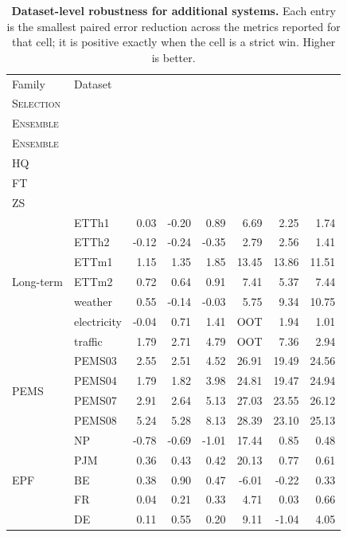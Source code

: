 \begin{table}[h!]
\centering
\scriptsize
\setlength{\tabcolsep}{3.5pt}
\caption{\textbf{Dataset-level robustness for additional systems.} Each entry is the smallest paired error reduction across the metrics reported for that cell; it is positive exactly when the cell is a strict win. Higher is better.}
\label{tab:strong-system-worst-gain}
\begin{tabular}{llrrrrrr}
\toprule
Family & Dataset & \shortstack{\textsc{Forward}\\\textsc{Selection}} & \shortstack{\textsc{Portfolio}\\\textsc{Ensemble}} & \shortstack{\textsc{ZeroShot}\\\textsc{Ensemble}} & \shortstack{\autogluon{}\\HQ} & \shortstack{\chronosbolt{}\\FT} & \shortstack{\chronosbolt{}\\ZS}\\
\midrule
\multirow{7}{*}{Long-term} & ETTh1 & 0.03 & -0.20 & 0.89 & 6.69 & 2.25 & 1.74\\
 & ETTh2 & -0.12 & -0.24 & -0.35 & 2.79 & 2.56 & 1.41\\
 & ETTm1 & 1.15 & 1.35 & 1.85 & 13.45 & 13.86 & 11.51\\
 & ETTm2 & 0.72 & 0.64 & 0.91 & 7.41 & 5.37 & 7.44\\
 & weather & 0.55 & -0.14 & -0.03 & 5.75 & 9.34 & 10.75\\
 & electricity & -0.04 & 0.71 & 1.41 & OOT & 1.94 & 1.01\\
 & traffic & 1.79 & 2.71 & 4.79 & OOT & 7.36 & 2.94\\
\midrule
\multirow{4}{*}{PEMS} & PEMS03 & 2.55 & 2.51 & 4.52 & 26.91 & 19.49 & 24.56\\
 & PEMS04 & 1.79 & 1.82 & 3.98 & 24.81 & 19.47 & 24.94\\
 & PEMS07 & 2.91 & 2.64 & 5.13 & 27.03 & 23.55 & 26.12\\
 & PEMS08 & 5.24 & 5.28 & 8.13 & 28.39 & 23.10 & 25.13\\
\midrule
\multirow{5}{*}{EPF} & NP & -0.78 & -0.69 & -1.01 & 17.44 & 0.85 & 0.48\\
 & PJM & 0.36 & 0.43 & 0.42 & 20.13 & 0.77 & 0.61\\
 & BE & 0.38 & 0.90 & 0.47 & -6.01 & -0.22 & 0.33\\
 & FR & 0.04 & 0.21 & 0.33 & 4.71 & 0.03 & 0.66\\
 & DE & 0.11 & 0.55 & 0.20 & 9.11 & -1.04 & 4.05\\
\bottomrule
\end{tabular}
\end{table}
